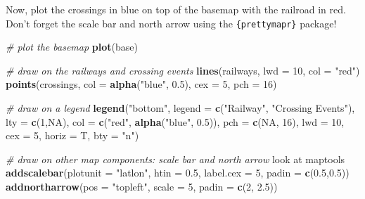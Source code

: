 \documentclass[]{book}
\newenvironment{Shaded}{\begin{snugshade}}{\end{snugshade}}
\newcommand{\KeywordTok}[1]{\textcolor[rgb]{0.13,0.29,0.53}{\textbf{#1}}}
\newcommand{\DataTypeTok}[1]{\textcolor[rgb]{0.13,0.29,0.53}{#1}}
\newcommand{\DecValTok}[1]{\textcolor[rgb]{0.00,0.00,0.81}{#1}}
\newcommand{\FloatTok}[1]{\textcolor[rgb]{0.00,0.00,0.81}{#1}}
\newcommand{\StringTok}[1]{\textcolor[rgb]{0.31,0.60,0.02}{#1}}
\newcommand{\CommentTok}[1]{\textcolor[rgb]{0.56,0.35,0.01}{\textit{#1}}}
\newcommand{\OtherTok}[1]{\textcolor[rgb]{0.56,0.35,0.01}{#1}}
\newcommand{\NormalTok}[1]{#1}
\theoremstyle{definition}
\theoremstyle{definition}
\theoremstyle{definition}
\theoremstyle{remark}
\begin{document}
Now, plot the crossings in blue on top of the basemap with the railroad
in red. Don't forget the scale bar and north arrow using the
\texttt{\{prettymapr\}} \citep{R-prettymapr} package!

\begin{Shaded}
\begin{Highlighting}[]
\CommentTok{# plot the basemap}
\KeywordTok{plot}\NormalTok{(base)}

\CommentTok{# draw on the railways and crossing events}
\KeywordTok{lines}\NormalTok{(railways, }\DataTypeTok{lwd =} \DecValTok{10}\NormalTok{, }\DataTypeTok{col =} \StringTok{"red"}\NormalTok{)}
\KeywordTok{points}\NormalTok{(crossings, }\DataTypeTok{col =} \KeywordTok{alpha}\NormalTok{(}\StringTok{"blue"}\NormalTok{, }\FloatTok{0.5}\NormalTok{), }\DataTypeTok{cex =} \DecValTok{5}\NormalTok{, }\DataTypeTok{pch =} \DecValTok{16}\NormalTok{)}

\CommentTok{# draw on a legend}
\KeywordTok{legend}\NormalTok{(}\StringTok{"bottom"}\NormalTok{, }\DataTypeTok{legend =} \KeywordTok{c}\NormalTok{(}\StringTok{"Railway"}\NormalTok{, }\StringTok{"Crossing Events"}\NormalTok{),}
       \DataTypeTok{lty =} \KeywordTok{c}\NormalTok{(}\DecValTok{1}\NormalTok{,}\OtherTok{NA}\NormalTok{), }\DataTypeTok{col =} \KeywordTok{c}\NormalTok{(}\StringTok{"red"}\NormalTok{, }\KeywordTok{alpha}\NormalTok{(}\StringTok{"blue"}\NormalTok{, }\FloatTok{0.5}\NormalTok{)),}
       \DataTypeTok{pch =} \KeywordTok{c}\NormalTok{(}\OtherTok{NA}\NormalTok{, }\DecValTok{16}\NormalTok{), }\DataTypeTok{lwd =} \DecValTok{10}\NormalTok{, }\DataTypeTok{cex =} \DecValTok{5}\NormalTok{, }\DataTypeTok{horiz =}\NormalTok{ T, }\DataTypeTok{bty =} \StringTok{"n"}\NormalTok{)}

\CommentTok{# draw on other map components: scale bar and north arrow}
\NormalTok{look at maptools}
\KeywordTok{addscalebar}\NormalTok{(}\DataTypeTok{plotunit =} \StringTok{"latlon"}\NormalTok{, }\DataTypeTok{htin =} \FloatTok{0.5}\NormalTok{,}
            \DataTypeTok{label.cex =} \DecValTok{5}\NormalTok{, }\DataTypeTok{padin =} \KeywordTok{c}\NormalTok{(}\FloatTok{0.5}\NormalTok{,}\FloatTok{0.5}\NormalTok{))}
\KeywordTok{addnortharrow}\NormalTok{(}\DataTypeTok{pos =} \StringTok{"topleft"}\NormalTok{, }\DataTypeTok{scale =} \DecValTok{5}\NormalTok{, }\DataTypeTok{padin =} \KeywordTok{c}\NormalTok{(}\DecValTok{2}\NormalTok{, }\FloatTok{2.5}\NormalTok{))}
\end{Highlighting}
\end{Shaded}
\end{document}
